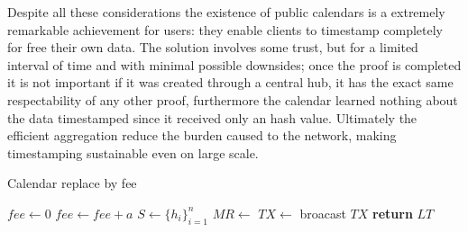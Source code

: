 Despite all these considerations the existence of public calendars is a extremely remarkable achievement for users: they enable clients to timestamp completely for free their own data. 
The solution involves some trust, but for a limited interval of time and with minimal possible downsides; once the proof is completed it is not important if it was created through a central hub, it has the exact same respectability of any other proof, furthermore the calendar learned nothing about the data timestamped since it received only an hash value. 
Ultimately the efficient aggregation reduce the burden caused to the network, making timestamping sustainable even on large scale.

\begin{algorithm}
	\caption{Calendar replace by fee}
	\label{alg:calendar-rbf}
	\begin{algorithmic}[1]
		\State $fee \gets 0$
		\Repeat 
		\State $fee \gets fee + a$
		\State $S \gets \{h_i\}_{i=1}^n$ 
		\State $MR \gets$ 
		\State $TX \gets$  
		\State broacast $TX$
		\State \textbf{return} $LT$ 
		\EndProcedure
	\end{algorithmic}
\end{algorithm}